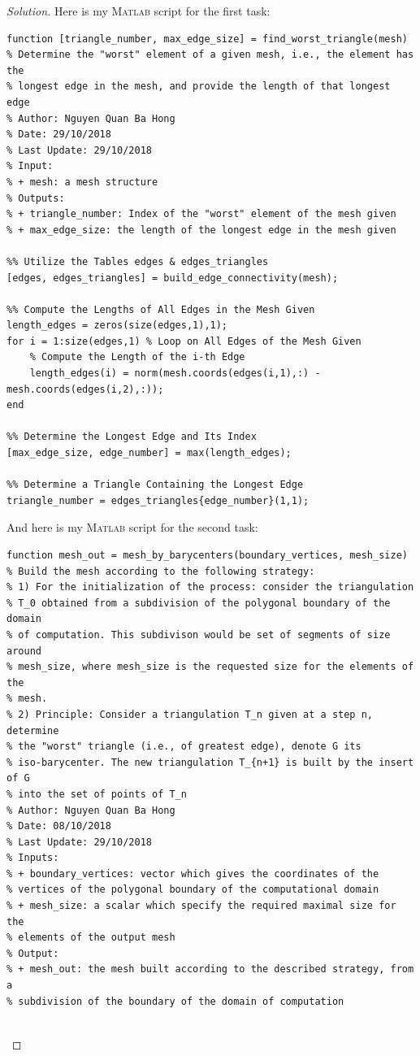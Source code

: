 \documentclass[11pt,a4paper,center,notitlepage]{article}
\numberwithin{equation}{section}
\begin{document}
\begin{proof}[Solution]
Here is my \textsc{Matlab} script for the first task:
\begin{verbatim}
function [triangle_number, max_edge_size] = find_worst_triangle(mesh)
% Determine the "worst" element of a given mesh, i.e., the element has the 
% longest edge in the mesh, and provide the length of that longest edge
% Author: Nguyen Quan Ba Hong
% Date: 29/10/2018
% Last Update: 29/10/2018
% Input:
% + mesh: a mesh structure
% Outputs:
% + triangle_number: Index of the "worst" element of the mesh given
% + max_edge_size: the length of the longest edge in the mesh given

%% Utilize the Tables edges & edges_triangles
[edges, edges_triangles] = build_edge_connectivity(mesh);

%% Compute the Lengths of All Edges in the Mesh Given
length_edges = zeros(size(edges,1),1); 
for i = 1:size(edges,1) % Loop on All Edges of the Mesh Given
    % Compute the Length of the i-th Edge
    length_edges(i) = norm(mesh.coords(edges(i,1),:) - mesh.coords(edges(i,2),:));
end

%% Determine the Longest Edge and Its Index
[max_edge_size, edge_number] = max(length_edges);

%% Determine a Triangle Containing the Longest Edge
triangle_number = edges_triangles{edge_number}(1,1);
\end{verbatim}
And here is my \textsc{Matlab} script for the second task:
\begin{verbatim}
function mesh_out = mesh_by_barycenters(boundary_vertices, mesh_size)
% Build the mesh according to the following strategy:
% 1) For the initialization of the process: consider the triangulation
% T_0 obtained from a subdivision of the polygonal boundary of the domain
% of computation. This subdivison would be set of segments of size around
% mesh_size, where mesh_size is the requested size for the elements of the
% mesh.
% 2) Principle: Consider a triangulation T_n given at a step n, determine
% the "worst" triangle (i.e., of greatest edge), denote G its
% iso-barycenter. The new triangulation T_{n+1} is built by the insert of G
% into the set of points of T_n
% Author: Nguyen Quan Ba Hong
% Date: 08/10/2018
% Last Update: 29/10/2018
% Inputs:
% + boundary_vertices: vector which gives the coordinates of the
% vertices of the polygonal boundary of the computational domain
% + mesh_size: a scalar which specify the required maximal size for the
% elements of the output mesh
% Output:
% + mesh_out: the mesh built according to the described strategy, from a
% subdivision of the boundary of the domain of computation


\end{verbatim}
\end{proof}
\end{document}
